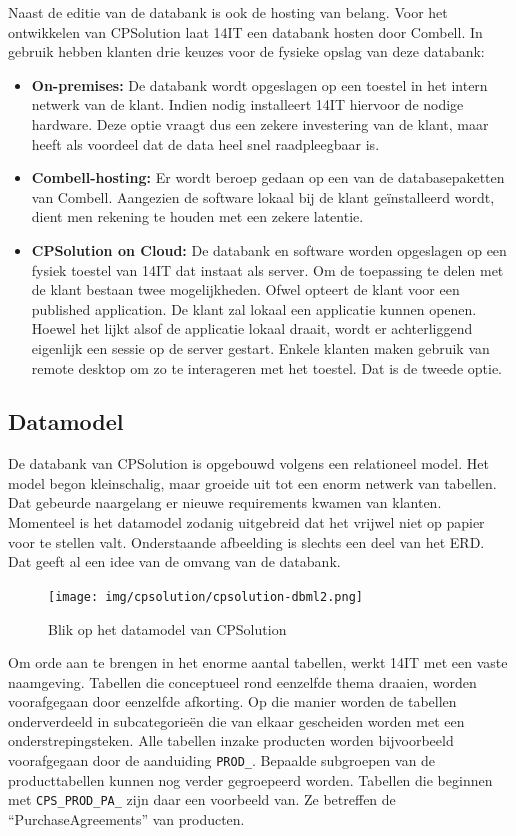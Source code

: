 Naast de editie van de databank is ook de hosting van belang. Voor het ontwikkelen van CPSolution laat 14IT een databank hosten door Combell. In gebruik hebben klanten drie keuzes voor de fysieke opslag van deze databank:

\begin{itemize}
	\item \textbf{On-premises:} De databank wordt opgeslagen op een toestel in het intern netwerk van de klant. Indien nodig installeert 14IT hiervoor de nodige hardware. Deze optie vraagt dus een zekere investering van de klant, maar heeft als voordeel dat de data heel snel raadpleegbaar is.
	\item \textbf{Combell-hosting:} Er wordt beroep gedaan op een van de databasepaketten van Combell. Aangezien de software lokaal bij de klant geïnstalleerd wordt, dient men rekening te houden met een zekere latentie.
	\item \textbf{CPSolution on Cloud:} De databank en software worden opgeslagen op een fysiek toestel van 14IT dat instaat als server. Om de toepassing te delen met de klant bestaan twee mogelijkheden. Ofwel opteert de klant voor een published application. De klant zal lokaal een applicatie kunnen openen. Hoewel het lijkt alsof de applicatie lokaal draait, wordt er achterliggend eigenlijk een sessie op de server gestart. Enkele klanten maken gebruik van remote desktop om zo te interageren met het toestel. Dat is de tweede optie.
\end{itemize}

\subsection{Datamodel}
\label{sub:datamodel}

De databank van CPSolution is opgebouwd volgens een relationeel model. Het model begon kleinschalig, maar groeide uit tot een enorm netwerk van tabellen. Dat gebeurde naargelang er nieuwe requirements kwamen van klanten. Momenteel is het datamodel zodanig uitgebreid dat het vrijwel niet op papier voor te stellen valt. Onderstaande afbeelding is slechts een deel van het ERD. Dat geeft al een idee van de omvang van de databank.

\begin{figure}[H]
	\centering
	\texttt{[image: img/cpsolution/cpsolution-dbml2.png]}
	\caption{\label{fig:cpsolution-dbml}Blik op het datamodel van CPSolution}
\end{figure}


Om orde aan te brengen in het enorme aantal tabellen, werkt 14IT met een vaste naamgeving.
Tabellen die conceptueel rond eenzelfde thema draaien, worden voorafgegaan door eenzelfde afkorting. Op die manier worden de tabellen onderverdeeld in subcategorieën die van elkaar gescheiden worden met een onderstrepingsteken. Alle tabellen inzake producten worden bijvoorbeeld voorafgegaan door de aanduiding \verb*|PROD_|. Bepaalde subgroepen van de producttabellen kunnen nog verder gegroepeerd worden. Tabellen die beginnen met \verb*|CPS_PROD_PA_| zijn daar een voorbeeld van. Ze betreffen de ``PurchaseAgreements'' van producten. 

